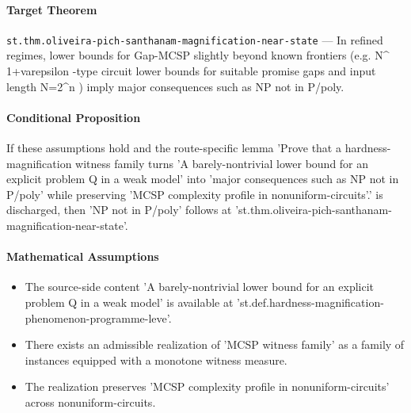 \documentclass[11pt]{article}
\begin{document}
\paragraph{Target Theorem}
\texttt{st.thm.oliveira-pich-santhanam-magnification-near-state} --- In refined regimes, lower bounds for Gap-MCSP slightly beyond known frontiers (e.g. N\textasciicircum{} 1+varepsilon -type circuit lower bounds for suitable promise gaps and input length N=2\textasciicircum{}n ) imply major consequences such as NP not in P/poly.

\paragraph{Conditional Proposition}
If these assumptions hold and the route-specific lemma 'Prove that a hardness-magnification witness family turns 'A barely-nontrivial lower bound for an explicit problem Q in a weak model' into 'major consequences such as NP not in P/poly' while preserving 'MCSP complexity profile in nonuniform-circuits'.' is discharged, then 'NP not in P/poly' follows at 'st.thm.oliveira-pich-santhanam-magnification-near-state'.

\paragraph{Mathematical Assumptions}
\begin{itemize}[leftmargin=*,itemsep=0.2em]
\item The source-side content 'A barely-nontrivial lower bound for an explicit problem Q in a weak model' is available at 'st.def.hardness-magnification-phenomenon-programme-leve'.
\item There exists an admissible realization of 'MCSP witness family' as a family of instances equipped with a monotone witness measure.
\item The realization preserves 'MCSP complexity profile in nonuniform-circuits' across nonuniform-circuits.
\end{itemize}
\end{document}
